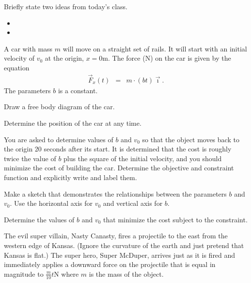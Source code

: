 \begin{problem}
\item Briefly state two ideas from today's class.
  \begin{itemize}
  \item 
  \item 
  \end{itemize}
\item A car with mass $m$ will move on a straight set of rails. It
  will start with an initial velocity of $v_0$ at the origin,
  $x=0$m. The force (N) on the car is given by the equation
  \begin{eqnarray*}
    \vec{F}_x(t) & = & m\cdot(bt) \vec{\imath}.
  \end{eqnarray*}
  The parameters $b$ is a constant.

  \begin{subproblem}
    \item Draw a free body diagram of the car.
      \vfill
    \item Determine the position of the car at any time. 
      \vfill

      \clearpage
      
    \item You are asked to determine values of $b$ and $v_0$ so that
      the object moves back to the origin 20 seconds after its
      start. It is determined that the cost is roughly twice the value
      of $b$ plus the square of the initial velocity, and you should
      minimize the cost of building the car. Determine the objective
      and constraint function and explicitly write and label them.

      \vfill

    \item Make a sketch that demonstrates the relationships between
      the parameters $b$ and $v_0$. Use the horizontal axis for $v_0$
      and vertical axis for $b$.

      \vfill

      \clearpage

    \item Determine the values of $b$ and $v_0$ that minimize the cost
      subject to the constraint.

      \vfill

  \end{subproblem}

  \clearpage

\item The evil super villain, Nasty Canasty, fires a projectile to the
  east from the western edge of Kansas.  (Ignore the curvature of the
  earth and just pretend that Kansas is flat.)  The super hero, Super
  McDuper, arrives just as it is fired and immediately applies a
  downward force on the projectile that is equal in magnitude to
  $\frac{m}{10}t$N where $m$ is the mass of the object.


\end{problem}
